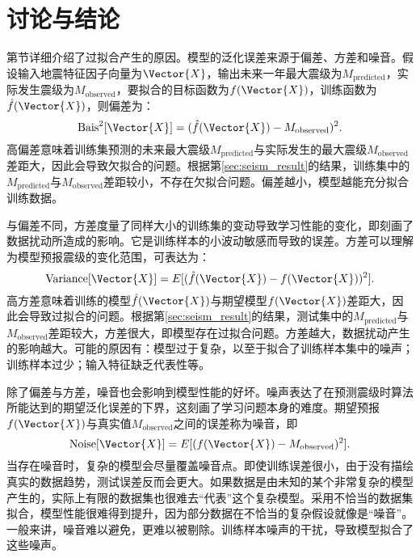 \section{讨论与结论}\label{sec:seism_conclusion}

第\label{sec:ml_fitting}节详细介绍了过拟合产生的原因。模型的泛化误差来源于偏差、方差和噪音。假设输入地震特征因子向量为$\Vector{X}$，输出未来一年最大震级为$M_{\text{predicted}}$，实际发生震级为$M_{\text{observed}}$，要拟合的目标函数为$f(\Vector{X})$，训练函数为$\hat{f}(\Vector{X})$，则偏差为：
\begin{equation}
  \label{eq:seism_bias}
  \mathrm{Bais}^2[\Vector{X}]=(\hat{f}(\Vector{X})-M_{\text{observed}})^2.
\end{equation}
高偏差意味着训练集预测的未来最大震级$M_{\text{predicted}}$与实际发生的最大震级$M_{\text{observed}}$差距大，因此会导致欠拟合的问题。根据第\ref{sec:seism_result}的结果，训练集中的$M_{\text{predicted}}$与$M_{\text{observed}}$差距较小，不存在欠拟合问题。偏差越小，模型越能充分拟合训练数据。

与偏差不同，方差度量了同样大小的训练集的变动导致学习性能的变化，即刻画了数据扰动所造成的影响。它是训练样本的小波动敏感而导致的误差。方差可以理解为模型预报震级的变化范围，可表达为：
\begin{equation}
  \label{eq:seism_variance}
  \mathrm{Variance}[\Vector{X}]=E[(\hat{f}(\Vector{X})-f(\Vector{X}))^2].
\end{equation}
高方差意味着训练的模型$\hat{f}(\Vector{X})$与期望模型$f(\Vector{X})$差距大，因此会导致过拟合的问题。根据第\ref{sec:seism_result}的结果，测试集中的$M_{\text{predicted}}$与$M_{\text{observed}}$差距较大，方差很大，即模型存在过拟合问题。方差越大，数据扰动产生的影响越大。可能的原因有：模型过于复杂，以至于拟合了训练样本集中的噪声；训练样本过少；输入特征缺乏代表性等。

除了偏差与方差，噪音也会影响到模型性能的好坏。噪声表达了在预测震级时算法所能达到的期望泛化误差的下界，这刻画了学习问题本身的难度。期望预报$f(\Vector{X})$与真实值$M_{\text{observed}}$之间的误差称为噪音，即
\begin{equation}
  \label{eq:ml_noise}
  \mathrm{Noise}[\Vector{X}]=E[(f(\Vector{X})-M_{\text{observed}})^2].
\end{equation}
当存在噪音时，复杂的模型会尽量覆盖噪音点。即使训练误差很小，由于没有描绘真实的数据趋势，测试误差反而会更大。如果数据是由未知的某个非常复杂的模型产生的，实际上有限的数据集也很难去“代表”这个复杂模型。采用不恰当的数据集拟合，模型性能很难得到提升，因为部分数据在不恰当的复杂假设就像是“噪音”。一般来讲，噪音难以避免，更难以被剔除。训练样本噪声的干扰，导致模型拟合了这些噪声。


